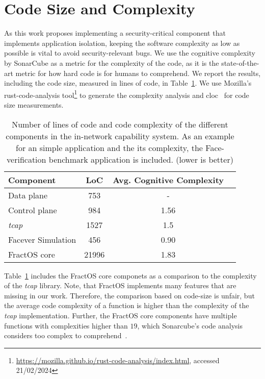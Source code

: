 \section{Code Size and Complexity}

As this work proposes implementing a security-critical component that implements application isolation, keeping the software complexity as low as possible is vital to avoid security-relevant bugs. We use the cognitive complexity~\cite{campbellCognitiveComplexityOverview2018} by SonarCube as a metric for the complexity of the code, as it is the state-of-the-art metric for how hard code is for humans to comprehend. We report the results, including the code size, measured in lines of code, in Table~\ref{table:code-metrics}\@. We use Mozilla's rust-code-analysis tool\footnote{\url{https://mozilla.github.io/rust-code-analysis/index.html}, accessed 21/02/2024} to generate the complexity analysis and cloc~\cite{aldanialAlDanialCloc2024} for code size measurements.

\begin{table}[H]
  \centering
  \begin{tabular}{lccc}
    \toprule
    Component & LoC & Avg. Cognitive Complexity & \\
    \midrule
    Data plane &753&-& \\
    Control plane &984& 1.56& \\
    \emph{tcap} &1527&1.5& \\
    Facever Simulation &456&0.90& \\
    \midrule
    FractOS core& 21996 & 1.83 & \\
    \bottomrule
  \end{tabular}
  \vspace{1em}
  \caption{\label{table:code-metrics} Number of lines of code and code complexity of the different components in the in-network capability system. As an example for an simple application and the its complexity, the Face-verification benchmark application is included. (lower is better)}
\end{table}


Table~\ref{table:code-metrics} includes the FractOS core componets as a comparison to the complexity of the \emph{tcap} library. Note, that FractOS implements many features that are missing in our work. Therefore, the comparison based on code-size is unfair, but the average code complexity of a function is higher than the complexity of the \emph{tcap} implementation. Further, the FractOS core components have multiple functions with complexities higher than $19$, which Sonarcube's code analysis considers too complex to comprehend~\cite{campbellCognitiveComplexityOverview2018}.\@

